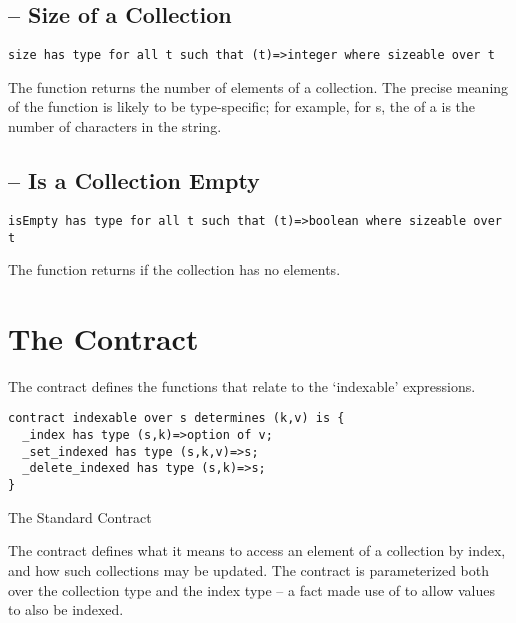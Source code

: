 \subsection{ -- Size of a  Collection}
\label{sizeFunction}
\begin{lstlisting}
size has type for all t such that (t)=>integer where sizeable over t
\end{lstlisting}

The  function returns the number of elements of a  collection. The precise meaning of the  function is likely to be type-specific; for example, for s, the  of a  is the number of characters in the string.

\subsection{ -- Is a  Collection Empty}
\label{isEmptyFunction}
\begin{lstlisting}
isEmpty has type for all t such that (t)=>boolean where sizeable over t
\end{lstlisting}
The  function returns  if the collection has no elements.

\section{The  Contract}
\label{indexableContract}
The  contract defines the functions that relate to the `indexable' expressions.

\begin{program}
\begin{lstlisting}
contract indexable over s determines (k,v) is {
  _index has type (s,k)=>option of v;
  _set_indexed has type (s,k,v)=>s;
  _delete_indexed has type (s,k)=>s;
}
\end{lstlisting}
\caption{The Standard  Contract}\label{indexableContractDef}
\end{program}

The  contract defines what it means to access an element of a collection by index, and how such collections may be updated. The contract is parameterized both over the collection type and the index type -- a fact made use of to allow  values to also be indexed.

